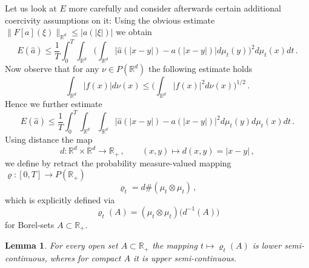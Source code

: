 \documentclass[A4paper,11pt]{article}
\newtheorem{lemma}[theorem]{Lemma}
\theoremstyle{definition}
\newcommand{\R}{\mathbb{R}}
\begin{document}
Let us look at $E$ more carefully and  consider afterwards certain additional coercivity assumptions on it: Using the obvious estimate $\bigl\|F[a](\xi)\bigr\|_{\R^d}\leq \bigl|a(|\xi|)\bigr|$ we obtain
\begin{equation*}
	E(\widehat a)
		\leq\frac{1}{T}\int_0^T\int_{\R^d}\biggl(\int_{\R^d}\bigl|\widehat a(|x-y|)-a(|x-y|)\bigr|
			d\mu_t(y)\biggr)^2 d\mu_t(x) dt\,.
\end{equation*}
Now observe that for any $\nu\in P(\R^d)$ the following estimate holds
\begin{equation*}
	\int_{\R^d}|f(x)|d\nu(x)\leq\biggl(\int_{\R^d}|f(x)|^2 d\nu(x)\biggr)^{1/2}\,.
\end{equation*}
Hence we further estimate
\begin{equation*}
	E(\widehat a)\leq\frac{1}{T}\int_0^T\int_{\R^d}\int_{\R^d}\bigl|\widehat a(|x-y|)-a(|x-y|)
		\bigr|^2 d\mu_t(y) d\mu_t(x) dt\,.
\end{equation*}
Using distance the map
\begin{equation*}
	d:\R^d\times\R^d\rightarrow\R_+\,,\qquad (x,y)\mapsto d(x,y)=|x-y|\,,
\end{equation*}
we define by retract the probability measure-valued mapping $\varrho:[0,T]\rightarrow P(\R_+)$
\begin{equation}\label{eq-rho}
	\varrho_t=d\# (\mu_t\otimes\mu_t)\,,
\end{equation}
which  is explicitly defined via
\begin{equation}\label{eq-rho-2}
	\varrho_t(A)=(\mu_t\otimes\mu_t)\bigl(d^{-1}(A)\bigr)
\end{equation}
for Borel-sets $A\subset\R_+$.

\begin{lemma}
	For every open set $A\subset\R_+$ the mapping $t\mapsto\varrho_t(A)$ is lower semi-continuous, wheres for
	compact $A$ it is upper semi-continuous.
\end{lemma}
\end{document}

